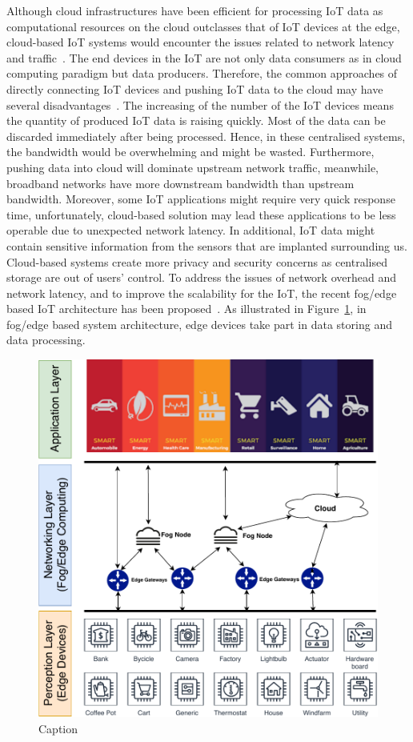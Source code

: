Although cloud infrastructures have been efficient for processing IoT data as computational resources on the cloud outclasses that of IoT devices at the edge, cloud-based IoT systems would encounter the issues related to network latency and traffic~\citep{Bonomi:2012,Zhang:2015,WShi:2016}.
The end devices in the IoT are not only data consumers as in cloud computing paradigm but data producers.
Therefore, the common approaches of directly connecting IoT devices and pushing IoT data to the cloud may have several disadvantages~\citep{Zhang:2015}.
The increasing of the number of the IoT devices means the quantity of produced IoT data is raising quickly.
Most of the data can be discarded immediately after being processed.
Hence, in these centralised systems, the bandwidth would be overwhelming and might be wasted.
Furthermore, pushing data into cloud will dominate upstream network traffic, meanwhile, broadband networks have more downstream bandwidth than upstream bandwidth.
Moreover, some IoT applications might require very quick response time, unfortunately, cloud-based solution may lead these applications to be less operable due to unexpected network latency.
In additional, IoT data might contain sensitive information from the sensors that are implanted surrounding us.
Cloud-based systems create more privacy and security concerns as centralised storage are out of users' control.
To address the issues of network overhead and network latency, and to improve the scalability for the IoT, the recent fog/edge based IoT architecture has been proposed~\citep{Bonomi:2014,Salman:2015}. 
As illustrated in Figure~\ref{fig:2.3.3-egdeIoT}, in fog/edge based system architecture, edge devices take part in data storing and data processing.

\begin{figure}[ht!]
    \centering
    \includegraphics[scale=.65]{Pictures/c2/2-4-Edge-based-architecture.pdf}
    \caption{Caption}
    \label{fig:2.3.3-egdeIoT}
\end{figure}

